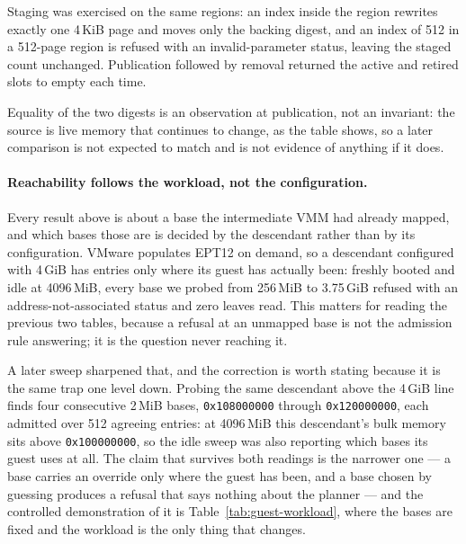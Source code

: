 \begin{table}[tbp]
\centering\small
\caption{A published 2\,MiB region over time. Digests are abbreviated to their
low 32 bits. ``Changed while idle'' counts samples after the first that differ
from it.}
\label{tab:region-decoupling}

\end{table}

Staging was exercised on the same regions: an index inside the region rewrites
exactly one 4\,KiB page and moves only the backing digest, and an index of 512 in
a 512-page region is refused with an invalid-parameter status, leaving the staged
count unchanged. Publication followed by removal returned the active and retired
slots to empty each time.

Equality of the two digests is an observation at publication, not an invariant:
the source is live memory that continues to change, as the table shows, so a
later comparison is not expected to match and is not evidence of anything if it
does.

\paragraph{Reachability follows the workload, not the configuration.}
Every result above is about a base the intermediate VMM had already mapped, and
which bases those are is decided by the descendant rather than by its
configuration. VMware populates EPT12 on demand, so a descendant configured with 4\,GiB has
entries only where its guest has actually been: freshly booted and idle at
4096\,MiB, every base we probed from 256\,MiB to 3.75\,GiB refused with an
address-not-associated status and zero leaves read. This matters for reading the
previous two tables, because a refusal at an unmapped base is not the admission
rule answering; it is the question never reaching it.

A later sweep sharpened that, and the correction is worth stating because it is
the same trap one level down. Probing the same descendant above the 4\,GiB line
finds four consecutive 2\,MiB bases, \texttt{0x108000000} through
\texttt{0x120000000}, each admitted over 512 agreeing entries: at 4096\,MiB this
descendant's bulk memory sits above \texttt{0x100000000}, so the idle sweep was
also reporting which bases its guest uses at all. The claim that survives both
readings is the narrower one --- a base carries an override only where the guest
has been, and a base chosen by guessing produces a refusal that says nothing
about the planner --- and the controlled demonstration of it is
Table~\ref{tab:guest-workload}, where the bases are fixed and the workload is
the only thing that changes.

